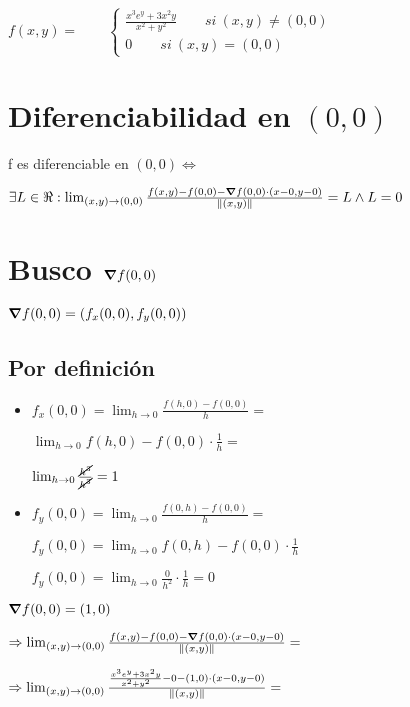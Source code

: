 \documentclass[../parcial.tex]{subfiles}
\begin{document}
    $ f(x,y) = \qquad \left\{
        \begin{array}{ll}
            \frac{x^3e^y+3x^2y}{x^2+y^2} \qquad si\ (x,y) \neq (0,0) \\
            0 \qquad si\ (x,y) = (0,0)
        \end{array}
    \right.$

    \section*{Diferenciabilidad en $(0,0)$}

    f es diferenciable en $(0,0) \Leftrightarrow$

    $ \exists L \in \real : \lim_{(x,y)\to (0,0)} \frac{f(x,y) - f(0,0) - \grad f (0,0) \cdot(x-0,y-0)}{\norm*{(x,y)}} = L \wedge L = 0 $

    \section*{Busco $\grad f(0,0)$}

    $ \grad f(0,0) = (f_x(0,0), f_y(0,0)) $

    \subsection*{Por definición}
    
    \begin{itemize}
        \item $ f_x(0,0) = \lim_{h\to0} \frac{f(h,0) - f(0,0)}{h} = $

            $ \lim_{h\to0} f(h,0) - f(0,0) \cdot \frac{1}{h} = $

            $ \lim_{h\to0} \frac{\cancel{h^3}}{\cancel{h^3}}  = 1$

        \item $ f_y(0,0) = \lim_{h\to0} \frac{f(0,h) - f(0,0)}{h} = $

            $ f_y(0,0) = \lim_{h\to0} f(0,h) - f(0,0) \cdot \frac{1}{h} $

            $ f_y(0,0) = \lim_{h\to0} \frac{0}{h^2} \cdot \frac{1}{h} = 0$
    \end{itemize}

    $ \grad f(0,0) = (1, 0) $

    $\Rightarrow \lim_{(x,y)\to (0,0)} \frac{f(x,y) - f(0,0) - \grad f (0,0) \cdot(x-0,y-0)}{\norm*{(x,y)}} = $

    $\Rightarrow \lim_{(x,y)\to (0,0)} \frac{ \frac{x^3e^y+3x^2y}{x^2+y^2} - 0 - (1,0) \cdot(x-0,y-0)}{\norm*{(x,y)}} = $
\end{document}
